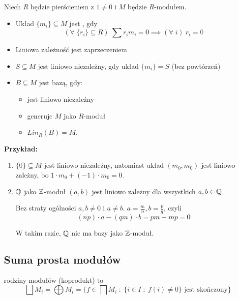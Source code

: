 \begin{bbox}
Niech $R$ będzie pierścieniem z $1\neq 0$ i $M$ będzie $R$-modułem.

\begin{itemize}%
    \item[\PHtunny] Układ $\{m_i\}\subseteq M$ jest , gdy
    $$(\forall\;\{r_i\}\subseteq R)\;\sum r_im_i=0\implies(\forall\;i)\;r_i=0$$
    \item[\PHtunny] Liniowa zależność jest zaprzeczeniem
    \item[\PHtunny] $S\subseteq M$ jest liniowo niezależny, gdy układ $\{m_i\}=S$ (bez powtórzeń)
    \item[\PHtunny] $B\subseteq M$ jest bazą, gdy:
    \begin{itemize}
        \item jest liniowo niezależny
        \item generuje $M$ jako $R$-moduł
        \item $Lin_R(B)=M$.
    \end{itemize}
\end{itemize}

\end{bbox}

\textbf{Przykład:}

\begin{enumerate}
    \item $\{0\}\subseteq M$ jest liniowo niezależny, natomiast układ $(m_0,m_0)$ jest liniowo zależny, bo $1\cdot m_0+(-1)\cdot m_0=0$.
    \item $\mathbb{Q}$ jako $\mathbb{Z}$-moduł $(a, b)$ jest liniowo zależny dla wszystkich $a,b\in\mathbb{Q}$.

    Bez straty ogólności $a,b\neq 0$ i $a\neq b$. $a=\frac{m}{n},b=\frac{p}{q}$, czyli
    $$(np)\cdot a-(qm)\cdot b=pm-mp=0$$

    W takim razie, $\mathbb{Q}$ nie ma bazy jako $\mathbb{Z}$-moduł.
\end{enumerate}

\setcounter{theorem}{0}
\subsection{Suma prosta modułów}

\begin{bbox}
 rodziny modułów (koprodukt) to
$$\bigsqcup M_i= \bigoplus M_i=\{f\in\bigsqcap M_i\;:\;\{i\in I\;:\;f(i)\neq 0\}\text{ jest skończony}\}$$
\end{bbox}

